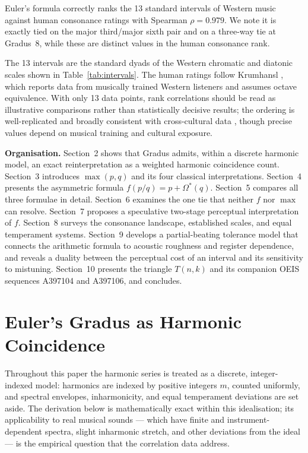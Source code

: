 \documentclass[11pt,a4paper]{article}
\newcommand{\Os}{\Omega^{\!*}}
\begin{document}
Euler's formula correctly ranks the 13 standard intervals of Western music
against human consonance ratings \cite{krumhansl1990} with Spearman
$\rho = 0.979$. We note it is exactly tied on the major third/major sixth pair
and on a three-way tie at Gradus~8, while these are distinct values in the
human consonance rank.

The 13 intervals are the standard dyads of the Western chromatic and diatonic
scales shown in Table~\ref{tab:intervals}. The human ratings follow
Krumhansl \cite{krumhansl1990}, which reports data from musically trained
Western listeners and assumes octave equivalence. With only 13 data points,
rank correlations should be read as illustrative comparisons rather than
statistically decisive results; the ordering is well-replicated
\cite{lahdelma2016,lahdelma2021} and broadly consistent with cross-cultural
data \cite{mcdermott2016,bowling2018}, though precise values depend on
musical training and cultural exposure.

\medskip\noindent
\textbf{Organisation.}
Section~2 shows that Gradus admits, within a discrete harmonic model, an
exact reinterpretation as a weighted harmonic coincidence count. Section~3 introduces $\max(p,q)$ and its four
classical interpretations. Section~4 presents the asymmetric formula
$f(p/q) = p + \Os(q)$. Section~5 compares all three formulae in detail.
Section~6 examines the one tie that neither $f$ nor $\max$ can resolve.
Section~7 proposes a speculative two-stage perceptual interpretation of $f$.
Section~8 surveys the consonance landscape, established scales, and equal
temperament systems. Section~9 develops a
partial-beating tolerance model that connects the arithmetic formula to
acoustic roughness and register dependence, and reveals a duality between
the perceptual cost of an interval and its sensitivity to mistuning.
Section~10 presents the triangle $T(n,k)$ and its companion OEIS sequences
A397104 and A397106, and concludes.


\section{Euler's Gradus as Harmonic Coincidence}

Throughout this paper the harmonic series is treated as a discrete,
integer-indexed model: harmonics are indexed by positive integers $m$,
counted uniformly, and spectral envelopes, inharmonicity, and equal
temperament deviations are set aside. The derivation below is mathematically
exact within this idealisation; its applicability to real musical sounds ---
which have finite and instrument-dependent spectra, slight inharmonic
stretch, and other deviations from the ideal --- is the empirical question
that the correlation data address.
\end{document}
